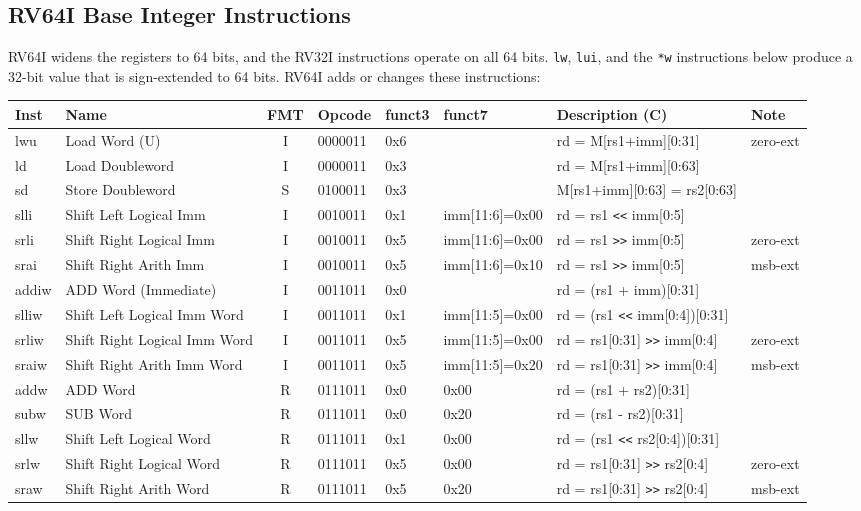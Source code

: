\subsection*{RV64I Base Integer Instructions}

\noindent RV64I widens the registers to 64 bits, and the RV32I instructions operate on all 64 bits. \texttt{lw}, \texttt{lui}, and the \texttt{*w} instructions below produce a 32-bit value that is sign-extended to 64 bits. RV64I adds or changes these instructions:

\smallskip
\begin{tabular}
{T | l | c | T | T | T | T | l} \hline
\rm Inst & Name                    & FMT & \rm Opcode & \rm funct3 & \rm funct7 & \rm Description (C)  & Note \\ \hline
lwu      & Load Word (U)           & I   & 0000011    & 0x6    &        & rd = M[rs1+imm][0:31]        & zero-ext \\
ld       & Load Doubleword         & I   & 0000011    & 0x3    &        & rd = M[rs1+imm][0:63]        & \\
sd       & Store Doubleword        & S   & 0100011    & 0x3    &        & M[rs1+imm][0:63] = rs2[0:63] & \\ \hline
slli     & Shift Left Logical Imm  & I   & 0010011    & 0x1    & imm[11:6]=0x00 & rd = rs1 \verb|<<| imm[0:5]  & \\
srli     & Shift Right Logical Imm & I   & 0010011    & 0x5    & imm[11:6]=0x00 & rd = rs1 \verb|>>| imm[0:5]  & zero-ext \\
srai     & Shift Right Arith Imm   & I   & 0010011    & 0x5    & imm[11:6]=0x10 & rd = rs1 \verb|>>| imm[0:5]  & msb-ext \\ \hline
addiw    & ADD Word (Immediate)    & I   & 0011011    & 0x0    &        & rd = (rs1 + imm)[0:31]       & \\
slliw    & Shift Left Logical Imm Word  & I & 0011011 & 0x1    & imm[11:5]=0x00 & rd = (rs1 \verb|<<| imm[0:4])[0:31] & \\
srliw    & Shift Right Logical Imm Word & I & 0011011 & 0x5    & imm[11:5]=0x00 & rd = rs1[0:31] \verb|>>| imm[0:4] & zero-ext \\
sraiw    & Shift Right Arith Imm Word   & I & 0011011 & 0x5    & imm[11:5]=0x20 & rd = rs1[0:31] \verb|>>| imm[0:4] & msb-ext \\ \hline
addw     & ADD Word                & R   & 0111011    & 0x0    & 0x00   & rd = (rs1 + rs2)[0:31]       & \\
subw     & SUB Word                & R   & 0111011    & 0x0    & 0x20   & rd = (rs1 - rs2)[0:31]       & \\
sllw     & Shift Left Logical Word & R   & 0111011    & 0x1    & 0x00   & rd = (rs1 \verb|<<| rs2[0:4])[0:31] & \\
srlw     & Shift Right Logical Word & R  & 0111011    & 0x5    & 0x00   & rd = rs1[0:31] \verb|>>| rs2[0:4] & zero-ext \\
sraw     & Shift Right Arith Word  & R   & 0111011    & 0x5    & 0x20   & rd = rs1[0:31] \verb|>>| rs2[0:4] & msb-ext \\ \hline
\end{tabular}
